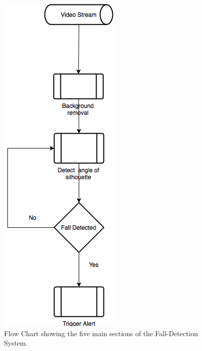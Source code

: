 \documentclass[11pt,a4paper]{report}
\begin{document}
\begin{figure}[H]
 \centering
 \includegraphics[scale = 0.4]{basicFlowChart.png}
 \caption{Flow Chart showing the five main sections of the Fall-Detection System.}
 \label{fig:basicFlowChart}
\end{figure}
\end{document}
